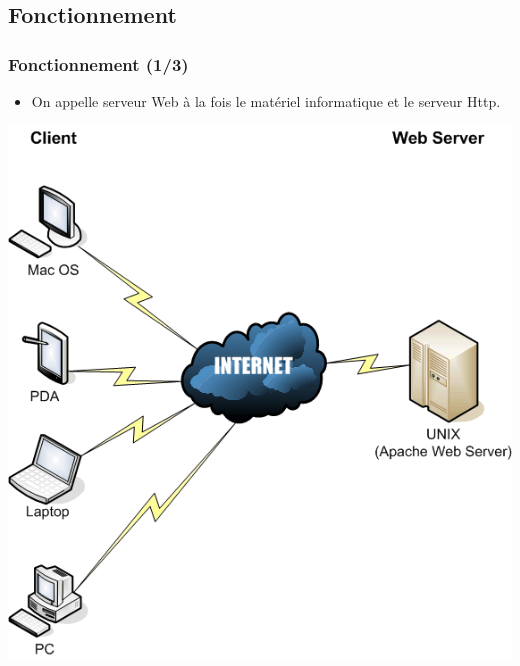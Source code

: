 \subsection{Fonctionnement}

\begin{frame}
	\frametitle{Fonctionnement (1/3)}
	\begin{itemize}
		\item On appelle \og{} serveur Web \fg{} à la fois le matériel informatique et le serveur Http.
	\end{itemize}
	\begin{center}
		\includegraphics[scale=0.25]{Images/nuage-apache.png}
	\end{center}
\end{frame}

